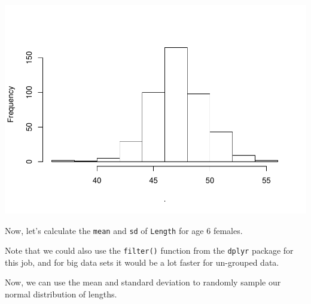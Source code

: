 \documentclass[
]{book}
\newenvironment{Shaded}{\begin{snugshade}}{\end{snugshade}}
\newcommand{\CommentTok}[1]{\textcolor[rgb]{0.56,0.35,0.01}{\textit{#1}}}
\newcommand{\DataTypeTok}[1]{\textcolor[rgb]{0.13,0.29,0.53}{#1}}
\newcommand{\DecValTok}[1]{\textcolor[rgb]{0.00,0.00,0.81}{#1}}
\newcommand{\KeywordTok}[1]{\textcolor[rgb]{0.13,0.29,0.53}{\textbf{#1}}}
\newcommand{\NormalTok}[1]{#1}
\newcommand{\OperatorTok}[1]{\textcolor[rgb]{0.81,0.36,0.00}{\textbf{#1}}}
\newcommand{\OtherTok}[1]{\textcolor[rgb]{0.56,0.35,0.01}{#1}}
\newcommand{\StringTok}[1]{\textcolor[rgb]{0.31,0.60,0.02}{#1}}
\begin{document}
\includegraphics{worstr_files/figure-latex/unnamed-chunk-81-1.pdf}

Now, let's calculate the \texttt{mean} and \texttt{sd} of \texttt{Length} for age 6 females.

\begin{Shaded}
\end{Shaded}

Note that we could also use the \texttt{filter()} function from the \texttt{dplyr} package for this job, and for big data sets it would be a lot faster for un-grouped data.

Now, we can use the mean and standard deviation to randomly sample our normal distribution of lengths.
\end{document}
